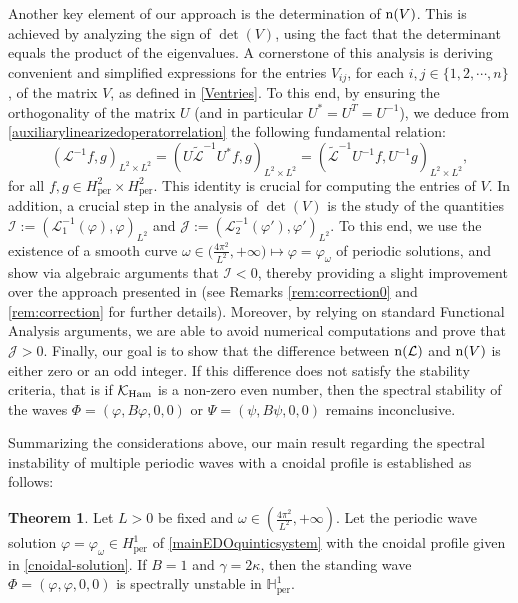 \documentclass[10pt,reqno,a4paper]{amsart} %
\theoremstyle{definition} %
\numberwithin{equation}{section}
\numberwithin{figure}{section}
\newtheorem{theorem}{Theorem}[section]
\begin{document}
Another key element of our approach is the determination of ${\rm n}(V)$. This is achieved by analyzing the sign of $\det(V)$, using the fact that the determinant equals the product of the eigenvalues. A cornerstone of this analysis is deriving convenient and simplified expressions for the entries $V_{ij}$, for each $i,j \in \{1,2,\cdots, n\}$, of the matrix $V$, as defined in \eqref{Ventries}. To this end, by ensuring the orthogonality of the matrix $U$ (and in particular $U^* = U^T = U^{-1}$), we deduce from \eqref{auxiliarylinearizedoperatorrelation} the following fundamental relation:
\begin{equation}\label{adjointrelatioapplication}
    (\mathcal{L}^{-1} f, g)_{L^2 \times L^2} = (U\widetilde{\mathcal{L}}^{-1}U^{*} f, g)_{L^2 \times L^2} = (\widetilde{\mathcal{L}}^{-1}U^{-1} f, U^{-1}g)_{L^2 \times L^2},
\end{equation}
for all $f, g \in H^2_{\text{per}} \times H^2_{\text{per}}$. This identity is crucial for computing the entries of $V$. In addition, a crucial step in the analysis of $\det(V)$ is the study of the quantities
$
\mathcal{I} := \left( \mathcal{L}_1^{-1}(\varphi), \varphi \right)_{L^2}$
and $
\mathcal{J} := \left( \mathcal{L}_2^{-1}(\varphi'), \varphi' \right)_{L^2}.
$
To this end, we use the existence of a smooth curve
$
\omega \in \big( \tfrac{4\pi^2}{L^2}, +\infty \big) \longmapsto \varphi = \varphi_\omega
$
of periodic solutions, and show via algebraic arguments that $\mathcal{I} < 0$, thereby providing a slight improvement over the approach presented in \cite{BittencourtLoreno2022} (see Remarks \ref{rem:correction0} and \ref{rem:correction} for further details).
Moreover, by relying on standard Functional Analysis arguments, we are able to avoid numerical computations and prove that $\mathcal{J} > 0$.  Finally, our goal is to show that the difference between ${\rm n}(\mathcal{L})$ and ${\rm n}(V)$ is either zero or an odd integer. If this difference does not satisfy the stability criteria, that is if $\mathcal{K_{\rm Ham}}$ is a non-zero even number, then the spectral stability of the waves $\Phi = (\varphi, B\varphi, 0, 0)$ or $\Psi = (\psi, B\psi, 0, 0)$ remains inconclusive.

Summarizing the considerations above, our main result regarding the spectral instability of multiple periodic waves with a cnoidal profile is established as follows:

\begin{theorem}\label{teorema-cnoidal}
     Let $L>0$ be fixed and $\omega \in \left( \frac{4\pi^2}{L^2}, +\infty \right)$. Let the periodic wave solution $\varphi=\varphi_\omega \in H^1_{\text{per}}$ of \eqref{mainEDOquinticsystem} with the cnoidal profile given in \eqref{cnoidal-solution}. If $B = 1$ and $\gamma = 2\kappa$, then the standing wave $\Phi = (\varphi, \varphi, 0, 0)$ is spectrally unstable in $\mathbb{H}^1_{\text{per}}$.%
\end{theorem}
\end{document}
